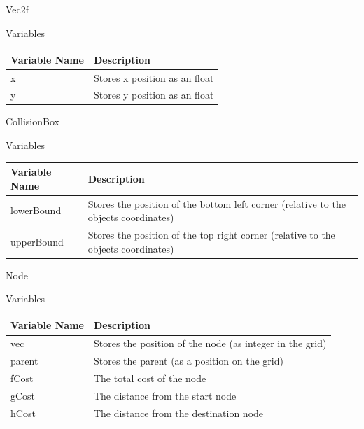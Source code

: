\documentclass{article}
\begin{document}
                Vec2f
                \begin{center}
                    Variables
                    \begin{tabular}{ | m{} | m{} | }
                        \hline
                        \textbf{Variable Name} & \textbf{Description} \\
                        \hline
                        x & Stores x position as an float \\
                        \hline
                        y & Stores y position as an float \\
                        \hline
                    \end{tabular}
                \end{center}
                CollisionBox
                \begin{center}
                    Variables
                    \begin{tabular}{ | m{} | m{} | }
                        \hline
                        \textbf{Variable Name} & \textbf{Description} \\
                        \hline
                        lowerBound & Stores the position of the bottom left corner (relative to the objects coordinates) \\
                        \hline
                        upperBound & Stores the position of the top right corner (relative to the objects coordinates) \\
                        \hline
                    \end{tabular}
                \end{center}
                Node
                \begin{center}
                    Variables
                    \begin{tabular}{ | m{} | m{} | }
                        \hline
                        \textbf{Variable Name} & \textbf{Description} \\
                        \hline
                        vec & Stores the position of the node (as integer in the grid) \\
                        \hline
                        parent & Stores the parent (as a position on the grid) \\
                        \hline
                        fCost & The total cost of the node \\
                        \hline
                        gCost & The distance from the start node \\
                        \hline
                        hCost & The distance from the destination node \\
                        \hline
                    \end{tabular}
                \end{center}
            \clearpage
\end{document}
